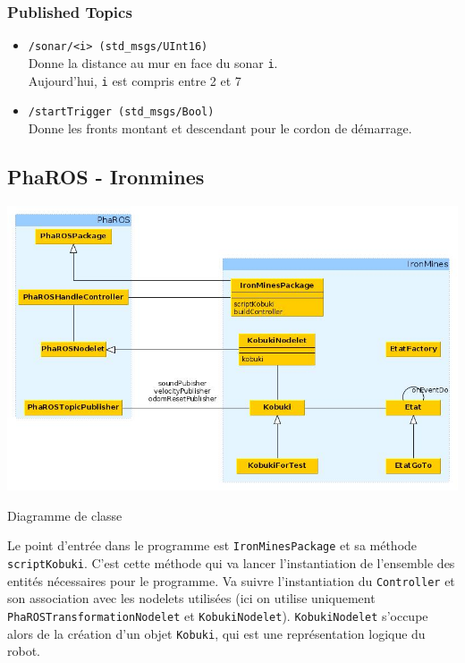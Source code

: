 \documentclass[a4paper, 11pt]{article}
\begin{document}
\subsubsection{Published Topics}

\begin{itemize}
\item \texttt{/sonar/<i> (std\_msgs/UInt16)}\\
  Donne la distance au mur en face du sonar \texttt{i}.\\
  Aujourd'hui, \texttt{i} est compris entre 2 et 7
\item \texttt{/startTrigger (std\_msgs/Bool)}\\ 
  Donne les fronts montant et descendant pour le cordon de démarrage.
\end{itemize}

\subsection{PhaROS - Ironmines}

\begin{center}
  \includegraphics[width=\linewidth]{./UMLClass.jpg}
  \caption{Diagramme de classe}
  \label{dia_class}
\end{center}

Le point d'entrée dans le programme est \texttt{IronMinesPackage} et
sa méthode \texttt{scriptKobuki}. C'est cette méthode qui va lancer
l'instantiation de l'ensemble des entités nécessaires pour le
programme. Va suivre l'instantiation du \texttt{Controller} et son
association avec les nodelets utilisées (ici on utilise uniquement
\texttt{PhaROSTransformationNodelet} et
\texttt{KobukiNodelet}). \texttt{KobukiNodelet} s'occupe alors de la
création d'un objet \texttt{Kobuki}, qui est une représentation
logique du robot.
\end{document}
